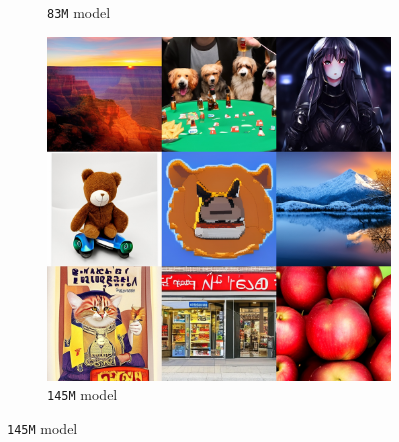 \begin{figure}[htbp]
\begin{subfigure}[b]{0.32\textwidth}
    \caption{\texttt{83M} model}
    \end{subfigure}
    \begin{subfigure}[b]{0.32\textwidth}
    \centering
    \includegraphics[width=\textwidth]{cp2/figures/t2i/c128.jpg}
    \caption{\texttt{145M} model}
    \end{subfigure}
    \hfill


\end{figure}
